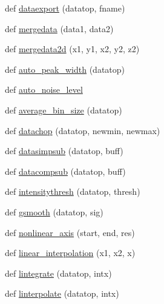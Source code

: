 \begin{DoxyCompactItemize}
\item 
def \hyperlink{namespace_uni_dec_1_1unidec__modules_1_1unidectools_ac9c1d713f69bd69b448ba9b9969453a5}{dataexport} (datatop, fname)
\item 
def \hyperlink{namespace_uni_dec_1_1unidec__modules_1_1unidectools_a2eea747b0cc3a0f497f7940bd8f82008}{mergedata} (data1, data2)
\item 
def \hyperlink{namespace_uni_dec_1_1unidec__modules_1_1unidectools_a24fe12fa1d6f2614caf4db943c62dbce}{mergedata2d} (x1, y1, x2, y2, z2)
\item 
def \hyperlink{namespace_uni_dec_1_1unidec__modules_1_1unidectools_ad6a5bf9ec469d3c576c5d7f0af0fd8a7}{auto\+\_\+peak\+\_\+width} (datatop)
\item 
def \hyperlink{namespace_uni_dec_1_1unidec__modules_1_1unidectools_a19dde6bcac6011919b9c4fc3a8f52a1c}{auto\+\_\+noise\+\_\+level}
\item 
def \hyperlink{namespace_uni_dec_1_1unidec__modules_1_1unidectools_a623c91ae287426fc236fef0fe5608c0d}{average\+\_\+bin\+\_\+size} (datatop)
\item 
def \hyperlink{namespace_uni_dec_1_1unidec__modules_1_1unidectools_a2eaa95251ac7f8683cf2c4e7470b6e26}{datachop} (datatop, newmin, newmax)
\item 
def \hyperlink{namespace_uni_dec_1_1unidec__modules_1_1unidectools_a46b9c7ccbccfe69477dc231b0334e0de}{datasimpsub} (datatop, buff)
\item 
def \hyperlink{namespace_uni_dec_1_1unidec__modules_1_1unidectools_a3859d85b4de1decba0cfe4a02ecef43a}{datacompsub} (datatop, buff)
\item 
def \hyperlink{namespace_uni_dec_1_1unidec__modules_1_1unidectools_a8c19513dd509855998c2deea6a5f7635}{intensitythresh} (datatop, thresh)
\item 
def \hyperlink{namespace_uni_dec_1_1unidec__modules_1_1unidectools_ac90576d54b13057aad7ab0ed8c67bf1b}{gsmooth} (datatop, sig)
\item 
def \hyperlink{namespace_uni_dec_1_1unidec__modules_1_1unidectools_a9db2f5ad0cabd51e0d1f91fccd414754}{nonlinear\+\_\+axis} (start, end, res)
\item 
def \hyperlink{namespace_uni_dec_1_1unidec__modules_1_1unidectools_ae906df1e0fbcccee6411b1f15645bfb9}{linear\+\_\+interpolation} (x1, x2, x)
\item 
def \hyperlink{namespace_uni_dec_1_1unidec__modules_1_1unidectools_a5981c884b0cb0e2a59819f075238b2c3}{lintegrate} (datatop, intx)
\item 
def \hyperlink{namespace_uni_dec_1_1unidec__modules_1_1unidectools_a3039288344c5d5da7e54ef292f32a2db}{linterpolate} (datatop, intx)

\end{DoxyCompactItemize}
